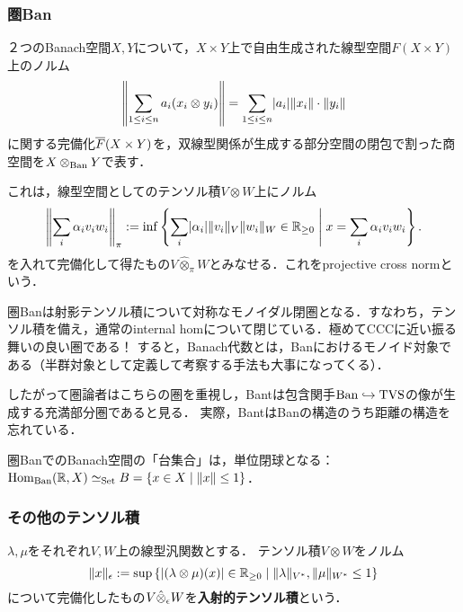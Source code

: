 \documentclass[uplatex,dvipdfmx]{jsreport}
\begin{document}
\subsubsection{圏Ban}

\begin{definition}
    ２つのBanach空間$X,Y$について，$X\times Y$上で自由生成された線型空間$F(X\times Y)$上のノルム
    \[\left\|\sum_{1\le i\le n}a_i(x_i\otimes y_i)\right\|=\sum_{1\le i\le n}\lvert a_i\rvert\|x_i\|\cdot\|y_i\|\]
    に関する完備化$\overline{F}(X\times Y)$を，双線型関係が生成する部分空間の閉包で割った商空間を$X\otimes_{\mathrm{Ban}} Y$で表す．
\end{definition}
\begin{remarks}
    これは，線型空間としてのテンソル積$V\otimes W$上にノルム
    \[\left\|\sum_i\alpha_iv_iw_i\right\|_\pi:=\inf\left\{\sum_i\lvert\alpha_i\rvert\|v_i\|_V\|w_i\|_W\in\mathbb{R}_{\ge 0}\;\middle|\; x=\sum_i\alpha_iv_iw_i\right\}.\]
    を入れて完備化して得たもの$V\hat{\otimes}_\pi W$とみなせる．これをprojective cross normという．
\end{remarks}

\begin{lemma}
    圏Banは射影テンソル積について対称なモノイダル閉圏となる．すなわち，テンソル積を備え，通常のinternal homについて閉じている．極めてCCCに近い振る舞いの良い圏である！
    すると，Banach代数とは，Banにおけるモノイド対象である（半群対象として定義して考察する手法も大事になってくる）．
\end{lemma}
\begin{remark}
    したがって圏論者はこちらの圏を重視し，Bantは包含関手$\mathrm{Ban}\hookrightarrow\mathrm{TVS}$の像が生成する充満部分圏であると見る．
    実際，BantはBanの構造のうち距離の構造を忘れている．
\end{remark}

\begin{lemma}
    圏BanでのBanach空間の「台集合」は，単位閉球となる：
    $\mathrm{Hom}_{\mathrm{Ban}}(\mathbb{R},X)\simeq_{\mathrm{Set}} B=\left\{x\in X\mid\|x\|\le 1\right\}$．
\end{lemma}

\subsubsection{その他のテンソル積}

\begin{definition}
    $\lambda,\mu$をそれぞれ$V,W$上の線型汎関数とする．
    テンソル積$V\otimes W$をノルム
    \[\|x\|_\epsilon:=\sup\left\{\lvert(\lambda\otimes\mu)(x)\rvert\in\mathbb{R}_{\ge 0}\;\middle|\;\|\lambda\|_{V^*},\|\mu\|_{W^*}\le 1\right\}\]
    について完備化したもの$V\hat{\otimes}_\epsilon W$を\textbf{入射的テンソル積}という．
\end{definition}
\end{document}

